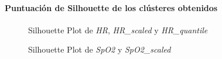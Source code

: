 \paragraph{Puntuación de Silhouette de los clústeres obtenidos}

\begin{figure}[H]
    \centering
    \caption{Silhouette Plot de \textit{HR}, \textit{HR\_scaled} y \textit{HR\_quantile}}\label{fig:raw_data_si_fc}
\end{figure}

\begin{figure}[ht]
    \centering
    \hfill
    \caption{Silhouette Plot de \textit{SpO2} y \textit{SpO2\_scaled}}\label{fig:raw_data_si_spo2}
\end{figure}

